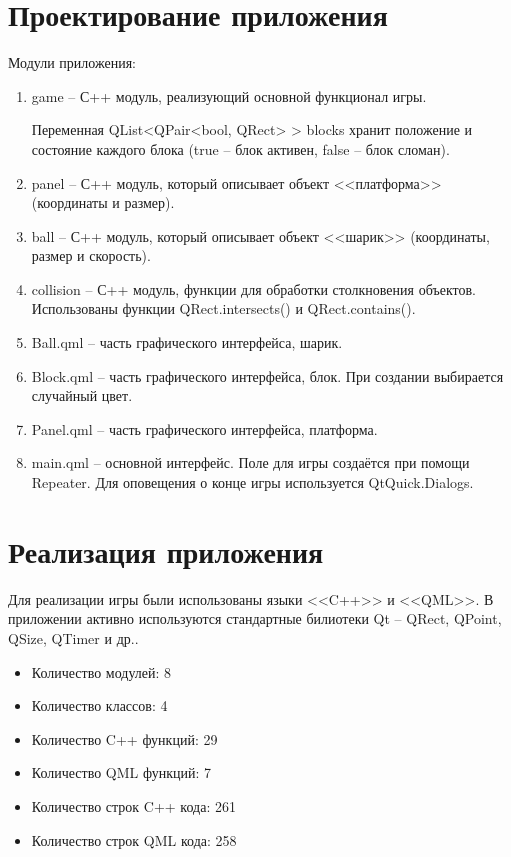 \documentclass[a4paper,12pt]{article}
\begin{document}

\section{Проектирование приложения}

Модули приложения:

\begin{enumerate}
    \item game -- С++ модуль, реализующий основной функционал игры.

          Переменная QList<QPair<bool, QRect> > blocks хранит положение и состояние каждого блока (true -- блок активен, false -- блок сломан).
    \item panel -- С++ модуль, который описывает объект <<платформа>> (координаты и размер).
    \item ball -- С++ модуль, который описывает объект <<шарик>> (координаты, размер и скорость).
    \item collision -- С++ модуль, функции для обработки столкновения объектов. Использованы функции QRect.intersects() и QRect.contains().
    \item Ball.qml -- часть графического интерфейса, шарик.
    \item Block.qml -- часть графического интерфейса, блок. При создании выбирается случайный цвет.
    \item Panel.qml -- часть графического интерфейса, платформа.
    \item main.qml -- основной интерфейс. Поле для игры создаётся при помощи Repeater. Для оповещения о конце игры используется QtQuick.Dialogs.
\end{enumerate}


\section{Реализация приложения}

Для реализации игры были использованы языки <<C++>> и <<QML>>. В приложении активно используются стандартные билиотеки Qt -- QRect, QPoint, QSize, QTimer и др..
\begin{itemize}
    \item Количество модулей: 8
    \item Количество классов: 4
    \item Количество C++ функций: 29
    \item Количество QML функций: 7
    \item Количество строк C++ кода: 261
    \item Количество строк QML кода: 258
\end{itemize}
\end{document}

